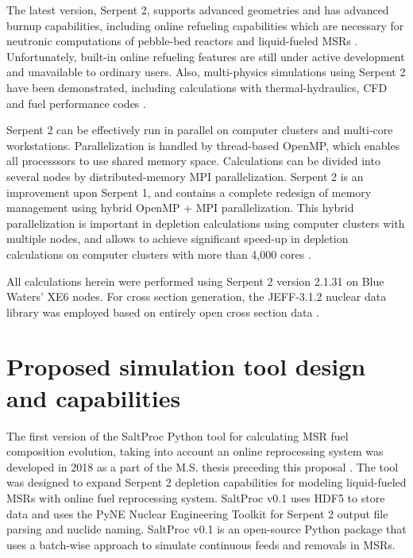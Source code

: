 The latest version, Serpent 2, supports advanced geometries and has advanced 
burnup capabilities, including online refueling capabilities which are 
necessary for neutronic computations of pebble-bed reactors and liquid-fueled 
\glspl{MSR} \cite{aufiero_extended_2013}. Unfortunately, built-in online 
refueling features are still under active development and unavailable to 
ordinary users. Also, multi-physics simulations using Serpent 2 have been  
demonstrated, including  calculations with thermal-hydraulics, \gls{CFD} and 
fuel performance codes \cite{leppanen_numerical_2015}. 

Serpent 2 can be effectively run in parallel on computer clusters and 
multi-core workstations. Parallelization is handled by thread-based OpenMP, 
which enables all processsors to use shared memory space. Calculations can be 
divided into several nodes by distributed-memory \gls{MPI} parallelization. 
Serpent 2  is an improvement upon Serpent 1, and contains a complete redesign 
of memory management using hybrid OpenMP \cite{dagum_openmp_1998} + \gls{MPI} 
parallelization.  This hybrid parallelization is important in depletion 
calculations using computer clusters with multiple nodes, and allows to 
achieve significant speed-up in depletion calculations on computer clusters 
with more than 4,000 cores \cite{leppanen_serpent_2014}. 

All calculations herein were performed using Serpent 2 version 2.1.31 on Blue 
Waters’ XE6 nodes. For cross section generation, the JEFF-3.1.2 nuclear data 
library was employed based on entirely open cross section data 
\cite{oecd/nea_jeff-3.1.2_2014}. 

\section{Proposed simulation tool design and capabilities} 
\label{sec:tool_design}
The first version of the SaltProc Python tool for calculating \gls{MSR} fuel 
composition evolution, taking into account an online reprocessing system 
was developed in 2018 as a part of the M.S. thesis preceding this proposal  
\cite{rykhlevskii_advanced_2018, rykhlevskii_arfc/saltproc_2018}. The tool was 
designed to expand Serpent 2 depletion capabilities for modeling liquid-fueled 
\glspl{MSR} with online fuel reprocessing system. SaltProc v0.1 uses HDF5 
\cite{the_hdf_group_hierarchical_1997} to store data and uses the PyNE Nuclear 
Engineering Toolkit \cite{scopatz_pyne_2012} for Serpent 2 output file parsing 
and nuclide naming. SaltProc v0.1 is an open-source Python package that uses a 
batch-wise approach to simulate continuous feeds and removals in \glspl{MSR}. 

